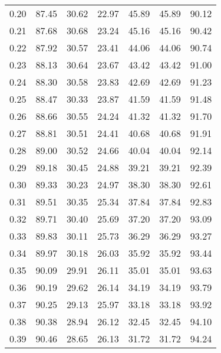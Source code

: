 \begin{tabular}{|c|c|c|c|c|c|c|}
      0.20 &     87.45 &     30.62 &      22.97 &   45.89 &      45.89 &         90.12 \\
      0.21 &     87.68 &     30.68 &      23.24 &   45.16 &      45.16 &         90.42 \\
      0.22 &     87.92 &     30.57 &      23.41 &   44.06 &      44.06 &         90.74 \\
      0.23 &     88.13 &     30.64 &      23.67 &   43.42 &      43.42 &         91.00 \\
      0.24 &     88.30 &     30.58 &      23.83 &   42.69 &      42.69 &         91.23 \\
      0.25 &     88.47 &     30.33 &      23.87 &   41.59 &      41.59 &         91.48 \\
      0.26 &     88.66 &     30.55 &      24.24 &   41.32 &      41.32 &         91.70 \\
      0.27 &     88.81 &     30.51 &      24.41 &   40.68 &      40.68 &         91.91 \\
      0.28 &     89.00 &     30.52 &      24.66 &   40.04 &      40.04 &         92.14 \\
      0.29 &     89.18 &     30.45 &      24.88 &   39.21 &      39.21 &         92.39 \\
      0.30 &     89.33 &     30.23 &      24.97 &   38.30 &      38.30 &         92.61 \\
      0.31 &     89.51 &     30.35 &      25.34 &   37.84 &      37.84 &         92.83 \\
      0.32 &     89.71 &     30.40 &      25.69 &   37.20 &      37.20 &         93.09 \\
      0.33 &     89.83 &     30.11 &      25.73 &   36.29 &      36.29 &         93.27 \\
      0.34 &     89.97 &     30.18 &      26.03 &   35.92 &      35.92 &         93.44 \\
      0.35 &     90.09 &     29.91 &      26.11 &   35.01 &      35.01 &         93.63 \\
      0.36 &     90.19 &     29.62 &      26.14 &   34.19 &      34.19 &         93.79 \\
      0.37 &     90.25 &     29.13 &      25.97 &   33.18 &      33.18 &         93.92 \\
      0.38 &     90.38 &     28.94 &      26.12 &   32.45 &      32.45 &         94.10 \\
      0.39 &     90.46 &     28.65 &      26.13 &   31.72 &      31.72 &         94.24 \\

\end{tabular}
